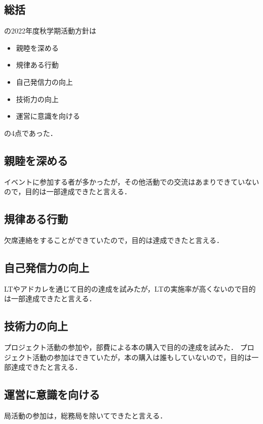 \subsection*{\firstGrade{}総括}


\firstGrade{}の2022年度秋学期活動方針は
\begin{itemize}
    \item 親睦を深める
    \item 規律ある行動
    \item 自己発信力の向上
    \item 技術力の向上
    \item 運営に意識を向ける
\end{itemize}
の4点であった．

\subsection*{親睦を深める}
イベントに参加する者が多かったが，その他活動での交流はあまりできていないので，目的は一部達成できたと言える．

\subsection*{規律ある行動}
欠席連絡をすることができていたので，目的は達成できたと言える．

\subsection*{自己発信力の向上}
LTやアドカレを通じて目的の達成を試みたが，LTの実施率が高くないので目的は一部達成できたと言える．

\subsection*{技術力の向上}
プロジェクト活動の参加や，部費による本の購入で目的の達成を試みた．
プロジェクト活動の参加はできていたが，本の購入は誰もしていないので，目的は一部達成できたと言える．

\subsection*{運営に意識を向ける}
局活動の参加は，総務局を除いてできたと言える．

